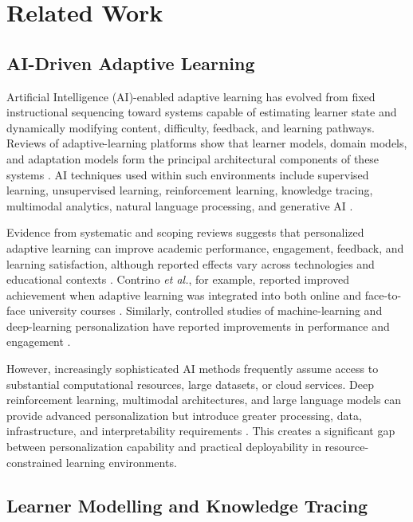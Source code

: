 \documentclass[conference]{IEEEtran}
\begin{document}
\section{Related Work}

\subsection{AI-Driven Adaptive Learning}

Artificial Intelligence (AI)-enabled adaptive learning has evolved from
fixed instructional sequencing toward systems capable of estimating
learner state and dynamically modifying content, difficulty, feedback,
and learning pathways. Reviews of adaptive-learning platforms show that
learner models, domain models, and adaptation models form the principal
architectural components of these systems \cite{tan2025}. AI techniques
used within such environments include supervised learning, unsupervised
learning, reinforcement learning, knowledge tracing, multimodal
analytics, natural language processing, and generative AI
\cite{hariyanto2025,matos2025}.

Evidence from systematic and scoping reviews suggests that personalized
adaptive learning can improve academic performance, engagement,
feedback, and learning satisfaction, although reported effects vary
across technologies and educational contexts
\cite{merino2025,duplooy2024}. Contrino \textit{et al.}, for example,
reported improved achievement when adaptive learning was integrated
into both online and face-to-face university courses
\cite{contrino2024}. Similarly, controlled studies of machine-learning
and deep-learning personalization have reported improvements in
performance and engagement \cite{hassanain2025,naseer2024}.

However, increasingly sophisticated AI methods frequently assume access
to substantial computational resources, large datasets, or cloud
services. Deep reinforcement learning, multimodal architectures, and
large language models can provide advanced personalization but introduce
greater processing, data, infrastructure, and interpretability
requirements \cite{ruan2025,farhah2025,pereira2025}. This creates a
significant gap between personalization capability and practical
deployability in resource-constrained learning environments.

\subsection{Learner Modelling and Knowledge Tracing}
\end{document}
